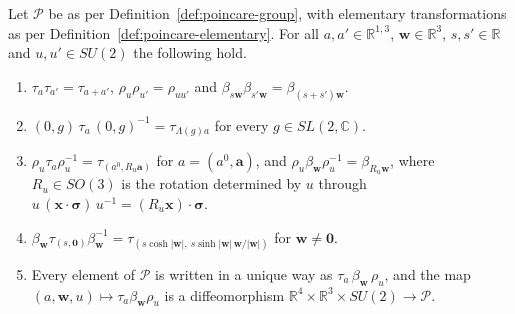 	\begin{lemma}\label{lem:poincare-relations}
		Let $\mathcal{P}$ be as per Definition~\ref{def:poincare-group}, with elementary transformations as per Definition~\ref{def:poincare-elementary}. For all $a,a'\in\mathbb{R}^{1,3}$, $\mathbf{w}\in\mathbb{R}^3$, $s,s'\in\mathbb{R}$ and $u,u'\in SU(2)$ the following hold.
		\begin{enumerate}
			\item $\tau_a\tau_{a'}=\tau_{a+a'}$, $\rho_u\rho_{u'}=\rho_{uu'}$ and $\beta_{s\mathbf{w}}\beta_{s'\mathbf{w}}=\beta_{(s+s')\mathbf{w}}$.
			\item $(0,g)\,\tau_a\,(0,g)^{-1}=\tau_{\Lambda(g)a}$ for every $g\in SL(2,\mathbb{C})$.
			\item $\rho_u\tau_a\rho_u^{-1}=\tau_{(a^0,R_u\mathbf{a})}$ for $a=(a^0,\mathbf{a})$, and $\rho_u\beta_{\mathbf{w}}\rho_u^{-1}=\beta_{R_u\mathbf{w}}$, where $R_u\in SO(3)$ is the rotation determined by $u$ through $u\,(\mathbf{x}\cdot\boldsymbol{\sigma})\,u^{-1}=(R_u\mathbf{x})\cdot\boldsymbol{\sigma}$.
			\item $\beta_{\mathbf{w}}\tau_{(s,\mathbf{0})}\beta_{\mathbf{w}}^{-1}=\tau_{(s\cosh|\mathbf{w}|,\ s\sinh|\mathbf{w}|\,\mathbf{w}/|\mathbf{w}|)}$ for $\mathbf{w}\neq\mathbf{0}$.
			\item Every element of $\mathcal{P}$ is written in a unique way as $\tau_a\,\beta_{\mathbf{w}}\,\rho_u$, and the map $(a,\mathbf{w},u)\mapsto\tau_a\beta_{\mathbf{w}}\rho_u$ is a diffeomorphism $\mathbb{R}^4\times\mathbb{R}^3\times SU(2)\to\mathcal{P}$.
		\end{enumerate}
	\end{lemma}
	
